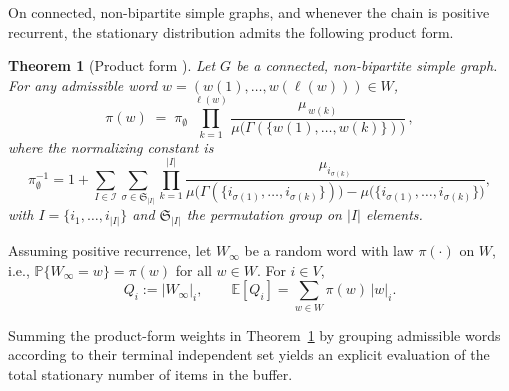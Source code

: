 \documentclass[11pt]{article}
\newtheorem{theorem}{Theorem}
\begin{document}
On connected, non-bipartite simple graphs, and whenever the chain is positive recurrent, the stationary distribution admits the following product form.
\begin{theorem}[Product form {\cite{MBMa21}}]\label{thm:pf-simple}
	Let $G$ be a connected, non-bipartite simple graph. For any admissible word $w=(w(1),\ldots,w(\ell(w)))\in W$,
	\begin{equation}\label{eq:product-form}
		\pi(w)\;=\;\pi_{\emptyset}\;\prod_{k=1}^{\ell(w)}\frac{\mu_{\,w(k)}}{\mu\!\bigl(\Gamma(\{w(1),\ldots,w(k)\})\bigr)}\,,
	\end{equation}
	where the normalizing constant is
	\begin{equation}\label{eq:pi0-general}
\pi_{\emptyset}^{-1}=1+\sum_{I\in\mathcal{I}}\sum_{\sigma\in \mathfrak{S}_{|I|}}\prod_{k=1}^{|I|}
\frac{\mu_{i_{\sigma(k)}}}{\mu\bigl(\Gamma(\{i_{\sigma(1)},\ldots,i_{\sigma(k)}\})\bigr)-\mu\bigl(\{i_{\sigma(1)},\ldots,i_{\sigma(k)}\}\bigr)},
	\end{equation}
	with $I=\{i_1,\ldots,i_{|I|}\}$ and $\mathfrak{S}_{|I|}$ the permutation group on $|I|$ elements.
\end{theorem}

Assuming positive recurrence, let $W_\infty$ be a random word with law $\pi(\cdot)$ on $W$, i.e., $\mathbb{P}\{W_\infty=w\}=\pi(w)$ for all $w\in W$.
For $i\in V$,
\begin{equation}\label{eq:defQi}
	Q_i:=|W_\infty|_i,\qquad 
	\mathbb{E}[Q_i]=\sum_{w\in W}\pi(w)\,|w|_i.
\end{equation}

\noindent
Summing the product-form weights in Theorem~\ref{thm:pf-simple} by grouping admissible words according to their terminal independent set yields an explicit evaluation of the total stationary number of items in the buffer.
\end{document}
